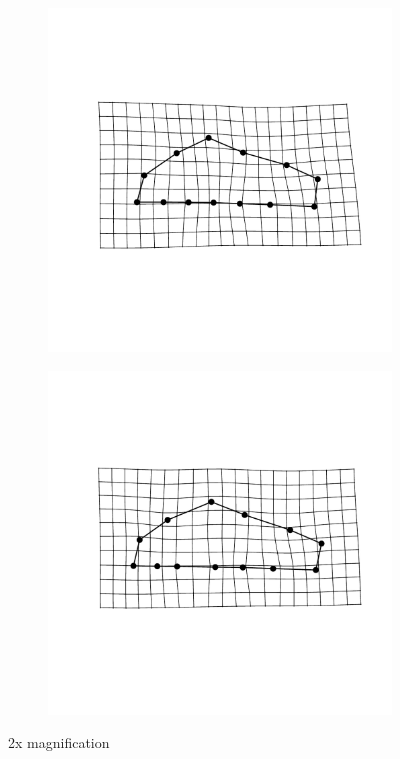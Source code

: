 \documentclass[12pt,letterpaper]{article}\usepackage{graphicx, color}
\begin{document}
\begin{figure}[ht]
  \begin{subfigure}[b]{0.4\textwidth}
    \centering
    \includegraphics[width = \textwidth]{figure/mshape_3}
    \label{fig:mean_shape3}
  \end{subfigure}
  \begin{subfigure}[b]{0.4\textwidth}
    \centering
    \includegraphics[width = \textwidth]{figure/mshape_4}
    \label{fig:mean_shape4}
  \end{subfigure}
  \caption{2x magnification}
  \label{fig:mean_shape}
\end{figure}
\end{document}
